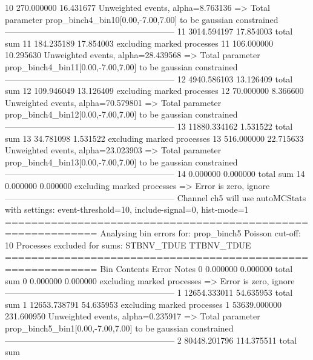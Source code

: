 10         270.000000      16.431677       Unweighted events, alpha=8.763136
  => Total parameter prop_binch4_bin10[0.00,-7.00,7.00] to be gaussian constrained
------------------------------------------------------------
11         3014.594197     17.854003       total sum                     
11         184.235189      17.854003       excluding marked processes    
11         106.000000      10.295630       Unweighted events, alpha=28.439568
  => Total parameter prop_binch4_bin11[0.00,-7.00,7.00] to be gaussian constrained
------------------------------------------------------------
12         4940.586103     13.126409       total sum                     
12         109.946049      13.126409       excluding marked processes    
12         70.000000       8.366600        Unweighted events, alpha=70.579801
  => Total parameter prop_binch4_bin12[0.00,-7.00,7.00] to be gaussian constrained
------------------------------------------------------------
13         11880.334162    1.531522        total sum                     
13         34.781098       1.531522        excluding marked processes    
13         516.000000      22.715633       Unweighted events, alpha=23.023903
  => Total parameter prop_binch4_bin13[0.00,-7.00,7.00] to be gaussian constrained
------------------------------------------------------------
14         0.000000        0.000000        total sum                     
14         0.000000        0.000000        excluding marked processes    
  => Error is zero, ignore      
------------------------------------------------------------
Channel ch5 will use autoMCStats with settings: event-threshold=10, include-signal=0, hist-mode=1
============================================================
Analysing bin errors for: prop_binch5
Poisson cut-off: 10
Processes excluded for sums: STBNV_TDUE TTBNV_TDUE
============================================================
Bin        Contents        Error           Notes                         
0          0.000000        0.000000        total sum                     
0          0.000000        0.000000        excluding marked processes    
  => Error is zero, ignore      
------------------------------------------------------------
1          12654.333011    54.635953       total sum                     
1          12653.738791    54.635953       excluding marked processes    
1          53639.000000    231.600950      Unweighted events, alpha=0.235917
  => Total parameter prop_binch5_bin1[0.00,-7.00,7.00] to be gaussian constrained
------------------------------------------------------------
2          80448.201796    114.375511      total sum                     
